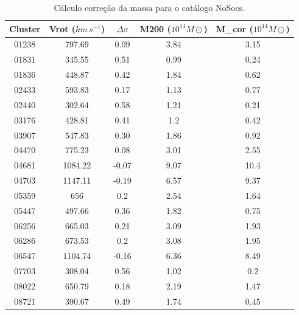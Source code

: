 {\small
\begin{longtable}{ccccc}
\caption{Cálculo correção da massa para o catálogo NoSocs.}
\label{tab:massnosocs}
\\ \hline
\textbf{Cluster} & \textbf{Vrot ($km \, s^{-1}$)} & \textbf{$\Delta \sigma$} &\textbf{M200 ($10^{14}  M\odot$)} & \textbf{M_{cor} ($10^{14}  M\odot$)}\\ \hline
01238 & 797.69 & 0.09 & 3.84 & 3.15 \\
01831 & 345.55 & 0.51 & 0.99 & 0.24 \\
01836 & 448.87 & 0.42 & 1.84 & 0.62 \\
02433 & 593.83 & 0.17 & 1.13 & 0.77 \\
02440 & 302.64 & 0.58 & 1.21 & 0.21 \\
03176 & 428.81 & 0.41 & 1.2 & 0.42 \\
03907 & 547.83 & 0.30 & 1.86 & 0.92 \\
04470 & 775.23 & 0.08 & 3.01 & 2.55 \\
04681 & 1084.22 & -0.07 & 9.07 & 10.4 \\
04703 & 1147.11 & -0.19 & 6.57 & 9.37 \\
05359 & 656 & 0.2 & 2.54 & 1.64 \\
05447 & 497.66 & 0.36 & 1.82 & 0.75 \\
06256 & 665.03 & 0.21 & 3.09 & 1.93 \\
06286 & 673.53 & 0.2 & 3.08 & 1.95 \\
06547 & 1104.74 & -0.16 & 6.36 & 8.49 \\
07703 & 308.04 & 0.56 & 1.02 & 0.2 \\
08022 & 650.79 & 0.18 & 2.19 & 1.47 \\
08721 & 390.67 & 0.49 & 1.74 & 0.45 \\

\end{longtable}}
